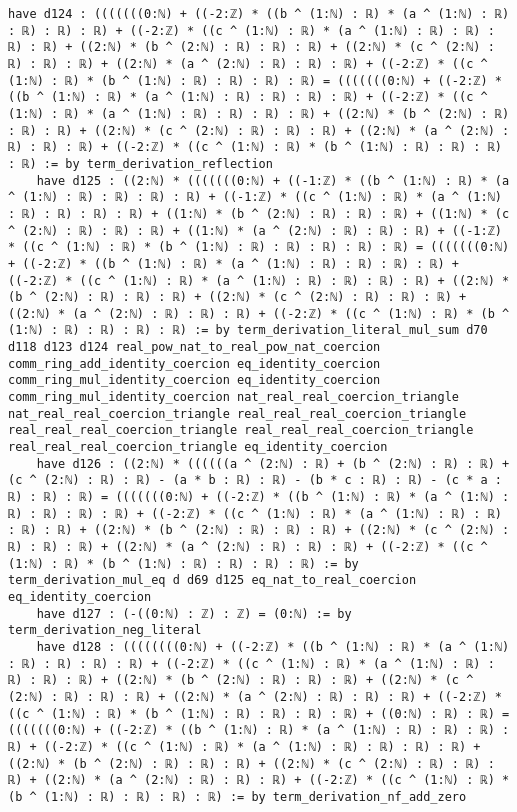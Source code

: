 \documentclass{article}
\begin{document}
\begin{tcolorbox}[colback=white!10, width=\linewidth]
\begin{lstlisting}[language=Lean4]
    have d124 : (((((((0:ℕ) + ((-2:ℤ) * ((b ^ (1:ℕ) : ℝ) * (a ^ (1:ℕ) : ℝ) : ℝ) : ℝ) : ℝ) + ((-2:ℤ) * ((c ^ (1:ℕ) : ℝ) * (a ^ (1:ℕ) : ℝ) : ℝ) : ℝ) : ℝ) + ((2:ℕ) * (b ^ (2:ℕ) : ℝ) : ℝ) : ℝ) + ((2:ℕ) * (c ^ (2:ℕ) : ℝ) : ℝ) : ℝ) + ((2:ℕ) * (a ^ (2:ℕ) : ℝ) : ℝ) : ℝ) + ((-2:ℤ) * ((c ^ (1:ℕ) : ℝ) * (b ^ (1:ℕ) : ℝ) : ℝ) : ℝ) : ℝ) = (((((((0:ℕ) + ((-2:ℤ) * ((b ^ (1:ℕ) : ℝ) * (a ^ (1:ℕ) : ℝ) : ℝ) : ℝ) : ℝ) + ((-2:ℤ) * ((c ^ (1:ℕ) : ℝ) * (a ^ (1:ℕ) : ℝ) : ℝ) : ℝ) : ℝ) + ((2:ℕ) * (b ^ (2:ℕ) : ℝ) : ℝ) : ℝ) + ((2:ℕ) * (c ^ (2:ℕ) : ℝ) : ℝ) : ℝ) + ((2:ℕ) * (a ^ (2:ℕ) : ℝ) : ℝ) : ℝ) + ((-2:ℤ) * ((c ^ (1:ℕ) : ℝ) * (b ^ (1:ℕ) : ℝ) : ℝ) : ℝ) : ℝ) := by term_derivation_reflection
    have d125 : ((2:ℕ) * (((((((0:ℕ) + ((-1:ℤ) * ((b ^ (1:ℕ) : ℝ) * (a ^ (1:ℕ) : ℝ) : ℝ) : ℝ) : ℝ) + ((-1:ℤ) * ((c ^ (1:ℕ) : ℝ) * (a ^ (1:ℕ) : ℝ) : ℝ) : ℝ) : ℝ) + ((1:ℕ) * (b ^ (2:ℕ) : ℝ) : ℝ) : ℝ) + ((1:ℕ) * (c ^ (2:ℕ) : ℝ) : ℝ) : ℝ) + ((1:ℕ) * (a ^ (2:ℕ) : ℝ) : ℝ) : ℝ) + ((-1:ℤ) * ((c ^ (1:ℕ) : ℝ) * (b ^ (1:ℕ) : ℝ) : ℝ) : ℝ) : ℝ) : ℝ) = (((((((0:ℕ) + ((-2:ℤ) * ((b ^ (1:ℕ) : ℝ) * (a ^ (1:ℕ) : ℝ) : ℝ) : ℝ) : ℝ) + ((-2:ℤ) * ((c ^ (1:ℕ) : ℝ) * (a ^ (1:ℕ) : ℝ) : ℝ) : ℝ) : ℝ) + ((2:ℕ) * (b ^ (2:ℕ) : ℝ) : ℝ) : ℝ) + ((2:ℕ) * (c ^ (2:ℕ) : ℝ) : ℝ) : ℝ) + ((2:ℕ) * (a ^ (2:ℕ) : ℝ) : ℝ) : ℝ) + ((-2:ℤ) * ((c ^ (1:ℕ) : ℝ) * (b ^ (1:ℕ) : ℝ) : ℝ) : ℝ) : ℝ) := by term_derivation_literal_mul_sum d70 d118 d123 d124 real_pow_nat_to_real_pow_nat_coercion comm_ring_add_identity_coercion eq_identity_coercion comm_ring_mul_identity_coercion eq_identity_coercion comm_ring_mul_identity_coercion nat_real_real_coercion_triangle nat_real_real_coercion_triangle real_real_real_coercion_triangle real_real_real_coercion_triangle real_real_real_coercion_triangle real_real_real_coercion_triangle eq_identity_coercion
    have d126 : ((2:ℕ) * ((((((a ^ (2:ℕ) : ℝ) + (b ^ (2:ℕ) : ℝ) : ℝ) + (c ^ (2:ℕ) : ℝ) : ℝ) - (a * b : ℝ) : ℝ) - (b * c : ℝ) : ℝ) - (c * a : ℝ) : ℝ) : ℝ) = (((((((0:ℕ) + ((-2:ℤ) * ((b ^ (1:ℕ) : ℝ) * (a ^ (1:ℕ) : ℝ) : ℝ) : ℝ) : ℝ) + ((-2:ℤ) * ((c ^ (1:ℕ) : ℝ) * (a ^ (1:ℕ) : ℝ) : ℝ) : ℝ) : ℝ) + ((2:ℕ) * (b ^ (2:ℕ) : ℝ) : ℝ) : ℝ) + ((2:ℕ) * (c ^ (2:ℕ) : ℝ) : ℝ) : ℝ) + ((2:ℕ) * (a ^ (2:ℕ) : ℝ) : ℝ) : ℝ) + ((-2:ℤ) * ((c ^ (1:ℕ) : ℝ) * (b ^ (1:ℕ) : ℝ) : ℝ) : ℝ) : ℝ) := by term_derivation_mul_eq d d69 d125 eq_nat_to_real_coercion eq_identity_coercion
    have d127 : (-((0:ℕ) : ℤ) : ℤ) = (0:ℕ) := by term_derivation_neg_literal
    have d128 : ((((((((0:ℕ) + ((-2:ℤ) * ((b ^ (1:ℕ) : ℝ) * (a ^ (1:ℕ) : ℝ) : ℝ) : ℝ) : ℝ) + ((-2:ℤ) * ((c ^ (1:ℕ) : ℝ) * (a ^ (1:ℕ) : ℝ) : ℝ) : ℝ) : ℝ) + ((2:ℕ) * (b ^ (2:ℕ) : ℝ) : ℝ) : ℝ) + ((2:ℕ) * (c ^ (2:ℕ) : ℝ) : ℝ) : ℝ) + ((2:ℕ) * (a ^ (2:ℕ) : ℝ) : ℝ) : ℝ) + ((-2:ℤ) * ((c ^ (1:ℕ) : ℝ) * (b ^ (1:ℕ) : ℝ) : ℝ) : ℝ) : ℝ) + ((0:ℕ) : ℝ) : ℝ) = (((((((0:ℕ) + ((-2:ℤ) * ((b ^ (1:ℕ) : ℝ) * (a ^ (1:ℕ) : ℝ) : ℝ) : ℝ) : ℝ) + ((-2:ℤ) * ((c ^ (1:ℕ) : ℝ) * (a ^ (1:ℕ) : ℝ) : ℝ) : ℝ) : ℝ) + ((2:ℕ) * (b ^ (2:ℕ) : ℝ) : ℝ) : ℝ) + ((2:ℕ) * (c ^ (2:ℕ) : ℝ) : ℝ) : ℝ) + ((2:ℕ) * (a ^ (2:ℕ) : ℝ) : ℝ) : ℝ) + ((-2:ℤ) * ((c ^ (1:ℕ) : ℝ) * (b ^ (1:ℕ) : ℝ) : ℝ) : ℝ) : ℝ) := by term_derivation_nf_add_zero

\end{lstlisting}
\end{tcolorbox}
\end{document}
